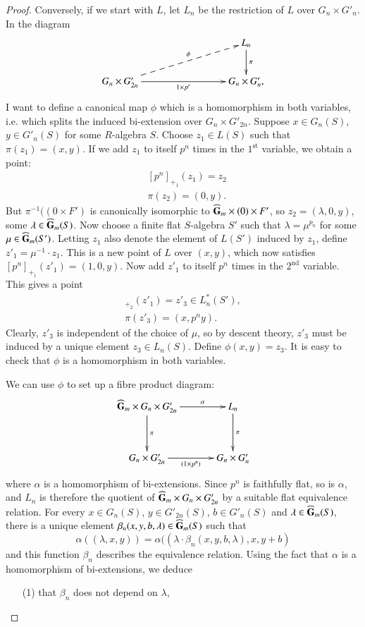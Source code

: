 \begin{proof}
Conversely, if we start with $L$, let $L_{n}$ be the restriction of $L$ over $G_{n}\times G'_{n}$. In the diagram
\[
\xymatrix@C=3cm{
& L_{n}\ar[d]^-{\pi}\\
G_{n}\times G'_{2n}\ar@{-->}[ur]^-{\phi}\ar[r]_-{1\times p^{r}} & G_{n}\times G'_{n},
}
\]
I want to define a canonical map $\phi$ which is a homomorphism in both variables, i.e. which splits the induced bi-extension over $G_{n}\times G'_{2n}$. Suppose $x\in G_{n}(S)$, $y\in G'_{n}(S)$ for some $R$-algebra $S$. Choose $z_{1}\in L(S)$ such that $\pi(z_{1})=(x,y)$. If we add $z_{1}$ to itself $p^{n}$ times in the $1^{\text{st}}$ variable, we obtain a point:
\begin{align*}
& [p^{n}]_{+_{1}}(z_{1})=z_{2}\\
& \pi(z_{2})=(0,y).
\end{align*}
But $\pi^{-1}((0\times F')$ is canonically isomorphic to $\widehat{\mathbf{G}}_{m}\times (0)\times F'$, so $z_{2}=(\lambda,0,y)$, some $\lambda\in \widehat{\mathbf{G}}_{m}(S)$. Now choose a finite flat $S$-algebra $S'$ such that $\lambda=\mu^{p_{n}}$ for some $\mu\in \widehat{\mathbf{G}}_{m}(S')$. Letting $z_{1}$ also denote the element of $L(S')$ induced by $z_{1}$, define $z'_{1}=\mu^{-1}\cdot z_{1}$. This is a new point of $L$ over $(x,y)$, which now satisfies $[p^{n}]_{+_{1}}(z'_{1})=(1,0,y)$. Now add $z'_{1}$ to itself $p^{n}$ times in the $2^{\text{nd}}$ variable. This gives a point
\begin{gather*}
[p^{n}]_{+_{2}}(z'_{1})=z'_{3}\in L^{*}_{n}(S'),\\
\pi(z'_{3})=(x,p^{n}y).
\end{gather*}\pageoriginale
Clearly, $z'_{3}$ is independent of the choice of $\mu$, so by descent theory, $z'_{3}$ must be induced by a unique element $z_{3}\in L_{n}(S)$. Define $\phi(x,y)=z_{3}$. It is easy to check that $\phi$ is a homomorphism in both variables.

We can use $\phi$ to set up a fibre product diagram:
\[
\xymatrix@=1.2cm{\widehat{\bfG}_{m}\times G_{n}\times G'_{2n}\ar[d]^-{\pi}\ar[r]^-{\alpha} & L_{n}\ar[d]^-{\pi}\\
G_{n}\times G'_{2n}\ar[r]_-{(1\times p^{n})} & G_{n}\times G'_{n}
}
\]
where $\alpha$ is a homomorphism of bi-extensions. Since $p^{n}$ is faithfully flat, so is $\alpha$, and $L_{n}$ is therefore the quotient of $\widehat{\mathbf{G}}_{m}\times G_{n}\times G'_{2n}$ by a suitable flat equivalence relation. For every $x\in G_{n}(S)$, $y\in G'_{2n}(S)$, $b\in G'_{n}(S)$ and $\lambda\in \widehat{\mathbf{G}}_{m}(S)$, there is a unique element $\beta_{n}(x,y,b,\lambda)\in \widehat{\mathbf{G}}_{m}(S)$ such that
$$
\alpha((\lambda,x,y))=\alpha((\lambda\cdot \beta_{n}(x,y,b,\lambda),x,y+b)
$$
and this function $\beta_{n}$ describes the equivalence relation. Using the fact that $\alpha$ is a homomorphism of bi-extensions, we deduce
\begin{itemize}
\item[(1)] that $\beta_{n}$ does not depend on $\lambda$,


\end{itemize}
\end{proof}
